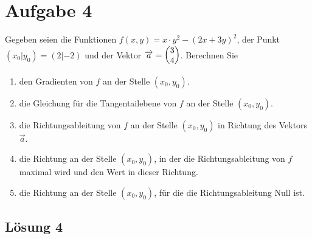 \documentclass[main.tex]{subfiles}
\begin{document}
\section{Aufgabe 4}
Gegeben seien die Funktionen $f(x, y) = x \cdot y^2 - (2x + 3y)^2$, der Punkt $(x_0|y_0) = (2|-2)$ und der Vektor $\vec{a} = \vektor{3 \\ 4}$.
Berechnen Sie
\begin{enumerate}
    \item den Gradienten von $f$ an der Stelle $(x_0, y_0)$.
    \item die Gleichung für die Tangentailebene von $f$ an der Stelle $(x_0, y_0)$.
    \item die Richtungsableitung von $f$ an der Stelle $(x_0, y_0)$ in Richtung des Vektors $\vec{a}$.
    \item die Richtung an der Stelle $(x_0, y_0)$, in der die Richtungsableitung von $f$ maximal wird und den Wert in dieser Richtung.
    \item die Richtung an der Stelle $(x_0, y_0)$, für die die Richtungsableitung Null ist.
\end{enumerate}


\subsection{Lösung 4}
\end{document}
